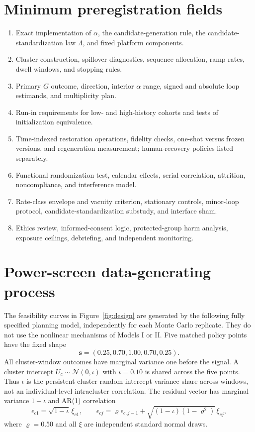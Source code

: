 \documentclass[pdflatex,sn-mathphys-num]{sn-jnl}
\begin{document}
\begin{appendices}
\section{Minimum preregistration fields}

\begin{enumerate}
  \item Exact implementation of $\alpha$, the candidate-generation rule, the candidate-standardization law $\Lambda$, and fixed platform components.
  \item Cluster construction, spillover diagnostics, sequence allocation, ramp rates, dwell windows, and stopping rules.
  \item Primary $G$ outcome, direction, interior $\alpha$ range, signed and absolute loop estimands, and multiplicity plan.
  \item Run-in requirements for low- and high-history cohorts and tests of initialization equivalence.
  \item Time-indexed restoration operations, fidelity checks, one-shot versus frozen versions, and regeneration measurement; human-recovery policies listed separately.
  \item Functional randomization test, calendar effects, serial correlation, attrition, noncompliance, and interference model.
  \item Rate-class envelope and vacuity criterion, stationary controls, minor-loop protocol, candidate-standardization substudy, and interface sham.
  \item Ethics review, informed-consent logic, protected-group harm analysis, exposure ceilings, debriefing, and independent monitoring.
\end{enumerate}

\section{Power-screen data-generating process}
\label{app:power-dgp}

The feasibility curves in Figure~\ref{fig:design} are generated by the following fully specified planning model, independently for each Monte Carlo replicate. They do not use the nonlinear mechanisms of Models I or II. Five matched policy points have the fixed shape
\begin{equation}
\bm s=(0.25,0.70,1.00,0.70,0.25).
\end{equation}
All cluster-window outcomes have marginal variance one before the signal. A cluster intercept $U_c\sim\mathcal N(0,\iota)$ with $\iota=0.10$ is shared across the five points. Thus $\iota$ is the persistent cluster random-intercept variance share across windows, not an individual-level intracluster correlation. The residual vector has marginal variance $1-\iota$ and AR(1) correlation
\begin{equation}
\epsilon_{c1}=\sqrt{1-\iota}\,\xi_{c1},\qquad
\epsilon_{cj}=\varrho\epsilon_{c,j-1}
+\sqrt{(1-\iota)(1-\varrho^2)}\,\xi_{cj},
\end{equation}
where $\varrho=0.50$ and all $\xi$ are independent standard normal draws.


\end{appendices}
\end{document}
